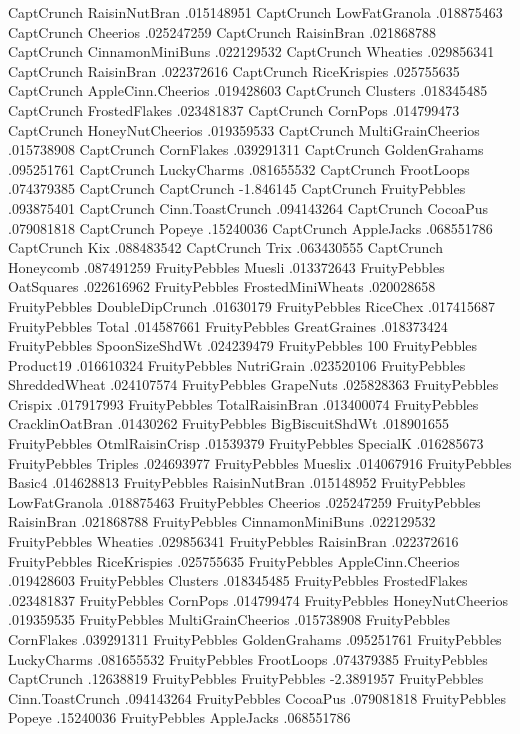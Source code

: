 CaptCrunch	RaisinNutBran	.015148951
CaptCrunch	LowFatGranola	.018875463
CaptCrunch	Cheerios	.025247259
CaptCrunch	RaisinBran	.021868788
CaptCrunch	CinnamonMiniBuns	.022129532
CaptCrunch	Wheaties	.029856341
CaptCrunch	RaisinBran	.022372616
CaptCrunch	RiceKrispies	.025755635
CaptCrunch	AppleCinn.Cheerios	.019428603
CaptCrunch	Clusters	.018345485
CaptCrunch	FrostedFlakes	.023481837
CaptCrunch	CornPops	.014799473
CaptCrunch	HoneyNutCheerios	.019359533
CaptCrunch	MultiGrainCheerios	.015738908
CaptCrunch	CornFlakes	.039291311
CaptCrunch	GoldenGrahams	.095251761
CaptCrunch	LuckyCharms	.081655532
CaptCrunch	FrootLoops	.074379385
CaptCrunch	CaptCrunch	-1.846145
CaptCrunch	FruityPebbles	.093875401
CaptCrunch	Cinn.ToastCrunch	.094143264
CaptCrunch	CocoaPus	.079081818
CaptCrunch	Popeye	.15240036
CaptCrunch	AppleJacks	.068551786
CaptCrunch	Kix	.088483542
CaptCrunch	Trix	.063430555
CaptCrunch	Honeycomb	.087491259
FruityPebbles	Muesli	.013372643
FruityPebbles	OatSquares	.022616962
FruityPebbles	FrostedMiniWheats	.020028658
FruityPebbles	DoubleDipCrunch	.01630179
FruityPebbles	RiceChex	.017415687
FruityPebbles	Total	.014587661
FruityPebbles	GreatGraines	.018373424
FruityPebbles	SpoonSizeShdWt	.024239479
FruityPebbles	100%
FruityPebbles	Product19	.016610324
FruityPebbles	NutriGrain	.023520106
FruityPebbles	ShreddedWheat	.024107574
FruityPebbles	GrapeNuts	.025828363
FruityPebbles	Crispix	.017917993
FruityPebbles	TotalRaisinBran	.013400074
FruityPebbles	CracklinOatBran	.01430262
FruityPebbles	BigBiscuitShdWt	.018901655
FruityPebbles	OtmlRaisinCrisp	.01539379
FruityPebbles	SpecialK	.016285673
FruityPebbles	Triples	.024693977
FruityPebbles	Mueslix	.014067916
FruityPebbles	Basic4	.014628813
FruityPebbles	RaisinNutBran	.015148952
FruityPebbles	LowFatGranola	.018875463
FruityPebbles	Cheerios	.025247259
FruityPebbles	RaisinBran	.021868788
FruityPebbles	CinnamonMiniBuns	.022129532
FruityPebbles	Wheaties	.029856341
FruityPebbles	RaisinBran	.022372616
FruityPebbles	RiceKrispies	.025755635
FruityPebbles	AppleCinn.Cheerios	.019428603
FruityPebbles	Clusters	.018345485
FruityPebbles	FrostedFlakes	.023481837
FruityPebbles	CornPops	.014799474
FruityPebbles	HoneyNutCheerios	.019359535
FruityPebbles	MultiGrainCheerios	.015738908
FruityPebbles	CornFlakes	.039291311
FruityPebbles	GoldenGrahams	.095251761
FruityPebbles	LuckyCharms	.081655532
FruityPebbles	FrootLoops	.074379385
FruityPebbles	CaptCrunch	.12638819
FruityPebbles	FruityPebbles	-2.3891957
FruityPebbles	Cinn.ToastCrunch	.094143264
FruityPebbles	CocoaPus	.079081818
FruityPebbles	Popeye	.15240036
FruityPebbles	AppleJacks	.068551786
